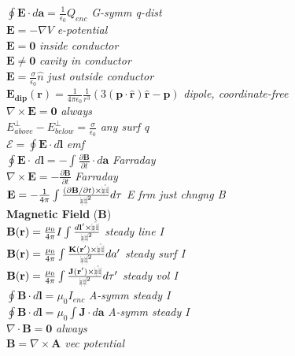 \documentclass[9pt]{extarticle}
\def\rcurs{{\mbox{$\resizebox{.09in}{.08in}{\texttt{[image: ScriptR]}}$}}}
\def\brcurs{{\mbox{$\resizebox{.09in}{.08in}{\texttt{[image: BoldR]}}$}}}
\begin{document}
\begin{multicols}{3}
$\oint\mathbf{E}\cdot d\mathbf{a} = \frac{1}{\epsilon_{0}}Q_{enc}$ \textit{G-symm q-dist} \\
$\mathbf{E} = -\nabla V$ \textit{e-potential} \\
$\mathbf{E} = \mathbf{0}$ \textit{inside conductor} \\
$\mathbf{E} \neq \mathbf{0}$ \textit{cavity in conductor} \\
$\mathbf{E} = \frac{\sigma}{\epsilon_{0}}\hat{n}$ \textit{just outside conductor} \\
$\mathbf{E_{dip}}(\mathbf{r}) = \frac{1}{4\pi\epsilon_{0}}\frac{1}{r^{3}}(3(\mathbf{p}\cdot\mathbf{\hat{r}})\mathbf{\hat{r}} - \mathbf{p})$ \textit{dipole, coordinate-free} \\
$\nabla\times\mathbf{E} = \mathbf{0}$ \textit{always} \\
$E^{\perp}_{above} - E^{\perp}_{below} = \frac{\sigma}{\epsilon_{0}}$ \textit{any surf q} \\
$\mathcal{E} = \oint\mathbf{E}\cdot d\mathbf{l}$ \textit{emf} \\
$\oint\mathbf{E}\cdot\ d\mathbf{l} = -\int\frac{\partial\mathbf{B}}{\partial t}\cdot d\mathbf{a}$ \textit{Farraday} \\
$\nabla\times\mathbf{E} = -\frac{\partial\mathbf{B}}{\partial t}$ \textit{Farraday} \\
$\mathbf{E} = -\frac{1}{4\pi}\int\frac{(\partial\mathbf{B}/\partial t)\times\hat{\brcurs}}{\rcurs^{2}}d\tau$ \textit{E frm just chngng B} \\
\textbf{Magnetic Field} ($\mathbf{B}$) \\
$\mathbf{B}(\mathbf{r}) = \frac{\mu_{0}}{4\pi}I\int\frac{d\mathbf{l}'\times\hat{\brcurs}}{\rcurs^{2}}$ \textit{steady line I} \\
$\mathbf{B}(\mathbf{r}) = \frac{\mu_{0}}{4\pi}\int\frac{\mathbf{K}(\mathbf{r}')\times\hat{\brcurs}}{\rcurs^{2}}da'$ \textit{steady surf I} \\
$\mathbf{B}(\mathbf{r}) = \frac{\mu_{0}}{4\pi}\int\frac{\mathbf{J}(\mathbf{r}')\times\hat{\brcurs}}{\rcurs^{2}}d\tau'$ \textit{steady vol I} \\
$\oint\mathbf{B}\cdot d\mathbf{l} = \mu_{0}I_{enc}$ \textit{A-symm steady I} \\
$\oint\mathbf{B}\cdot d\mathbf{l} = \mu_{0}\int\mathbf{J}\cdot d\mathbf{a}$ \textit{A-symm steady I} \\
$\nabla\cdot\mathbf{B} = \mathbf{0}$ \textit{always} \\
$\mathbf{B} = \nabla\times\mathbf{A}$ \textit{vec potential} \\

\end{multicols}
\end{document}
